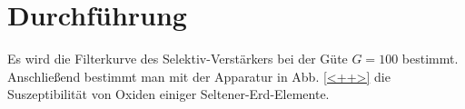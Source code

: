 \section{Durchführung}
\label{sec:Durchführung}

Es wird die Filterkurve des Selektiv-Verstärkers bei der Güte $G=\num{100}$ bestimmt. 
Anschließend bestimmt man mit der Apparatur in Abb. \ref{<++>} die Suszeptibilität von Oxiden einiger Seltener-Erd-Elemente. 
